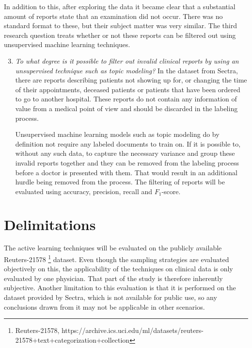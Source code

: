 In addition to this, after exploring the data it became clear that a substantial amount of reports state that an examination did not occur.
There was no standard format to these, but their subject matter was very similar.
The third research question treats whether or not these reports can be filtered out using unsupervised machine learning techniques.

\begin{enumerate}
      \setcounter{enumi}{2}
      \item \label{intro:re-q3}
      \textit{To what degree is it possible to filter out invalid clinical reports by using an unsupervised technique such as topic modeling?}
      \newline
      In the dataset from Sectra, there are reports describing patients not showing up for, or changing the time of their appointments, deceased patients or patients that have been ordered to go to another hospital.
      These reports do not contain any information of value from a medical point of view and should be discarded in the labeling process.

      Unsupervised machine learning models such as topic modeling do by definition not require any labeled documents to train on.
      If it is possible to, without any such data, to capture the necessary variance and group these invalid reports together and they can be removed from the labeling process before a doctor is presented with them.
      That would result in an additional hurdle being removed from the process.
      The filtering of reports will be evaluated using  accuracy, precision, recall and $F_1$-score.
\end{enumerate}

\section{Delimitations}
\label{sec:delimitations}

The active learning techniques will be evaluated on the publicly available Reuters-21578 \footnote{Reuters-21578, https://archive.ics.uci.edu/ml/datasets/reuters-21578+text+categorization+collection} dataset.
Even though the sampling strategies are evaluated objectively on this, the applicability of the techniques on clinical data is only evaluated by one physician.
That part of the study is therefore inherently subjective.
Another limitation to this evaluation is that it is performed on the dataset provided by Sectra, which is not available for public use, so any conclusions drawn from it may not be applicable in other scenarios.

